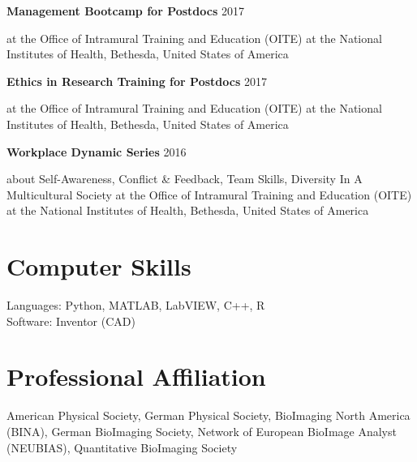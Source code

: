 \documentclass[margin,line]{res}
\begin{document}
\begin{resume}
\vspace*{-2mm}

{\bf Management Bootcamp for Postdocs} \hfill {2017}\\
\vspace*{-3.5mm}
\begin{addmargin}[0pt]{.1\linewidth}
\vspace*{-1mm}
at the Office of Intramural Training and Education (OITE) at the National Institutes of Health, Bethesda, United States of America
\end{addmargin}

\vspace*{-2mm}

{\bf Ethics in Research Training for Postdocs} \hfill {2017}\\
\vspace*{-3.5mm}
\begin{addmargin}[0pt]{.1\linewidth}
\vspace*{-1mm}
at the Office of Intramural Training and Education (OITE) at the National Institutes of Health, Bethesda, United States of America
\end{addmargin}

\vspace*{-2mm}

{\bf Workplace Dynamic Series} \hfill {2016}\\
\vspace*{-3.5mm}
\begin{addmargin}[0pt]{.1\linewidth}
\vspace*{-1mm}
about Self-Awareness, Conflict \& Feedback, Team Skills, Diversity In A Multicultural Society at the Office of Intramural Training and Education (OITE) at the National Institutes of Health, Bethesda, United States of America
\end{addmargin}


\section{\sc Computer Skills} 

Languages:  Python, MATLAB, LabVIEW, C++, R\\ %
Software: Inventor (CAD)%


\section{\sc Professional Affiliation} 
American Physical Society, German Physical Society, BioImaging North America (BINA), German BioImaging Society, Network of European BioImage Analyst (NEUBIAS), Quantitative BioImaging Society


\end{resume}
\end{document}
